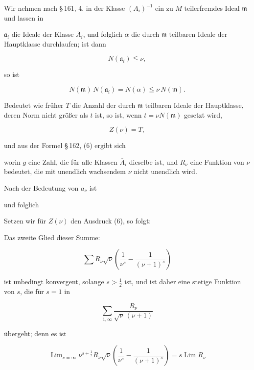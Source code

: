 
Wir nehmen nach \S\,161, 4. in der Klasse $(A_i)^{-1}$ ein zu $M$ teilerfremdes Ideal $\mathfrak{m}$ und lassen in


$\mathfrak{a}_i$ die Ideale der Klasse $\overline{A}_i$, und folglich $\overline{\alpha}$ die durch $\mathfrak{m}$ teilbaren Ideale der Hauptklasse durchlaufen; ist dann

\[
N(\mathfrak{a}_i) \leqq \nu,
\]

so ist

\[
N(\mathfrak{m})\,N(\mathfrak{a}_i) = N(\alpha) \leqq \nu\,N(\mathfrak{m}).
\]

Bedeutet wie früher $T$ die Anzahl der durch $\mathfrak{m}$ teilbaren Ideale der Hauptklasse, deren Norm nicht größer als $t$ ist, so ist, wenn $t = \nu N(\mathfrak{m})$ gesetzt wird,

\[
Z(\nu) = T,
\]

und aus der Formel \S\,162, (6) ergibt sich


worin $g$ eine Zahl, die für alle Klassen $\overline{A}_i$ dieselbe ist, und $R_\nu$ eine Funktion von $\nu$ bedeutet, die mit unendlich wachsendem $\nu$ nicht unendlich wird.

Nach der Bedeutung von $a_\nu$ ist


und folglich


Setzen wir für $Z(\nu)$ den Ausdruck (6), so folgt:


Das zweite Glied dieser Summe:

\[
\sum R_\nu\sqrt{\nu}\left(\frac{1}{\nu^s} - \frac{1}{(\nu+1)^s}\right)
\]

ist unbedingt konvergent, solange $s > \frac{1}{2}$ ist, und ist daher eine stetige Funktion von $s$, die für $s = 1$ in

\[
\sum_{1,\infty}\frac{R_\nu}{\sqrt{\nu}\,(\nu+1)}
\]

übergeht; denn es ist

\[
\operatorname{Lim}_{\nu=\infty} \nu^{s+\frac{1}{2}} R_\nu \sqrt{\nu}\left(\frac{1}{\nu^s} - \frac{1}{(\nu+1)^s}\right) = s\operatorname{Lim} R_\nu
\]
